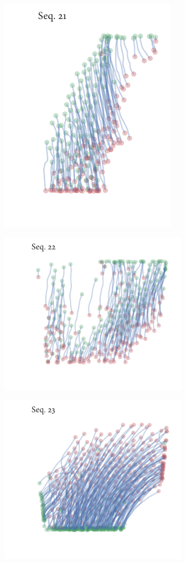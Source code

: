 \begin{figure}[h]
\begin{subfigure}[t]{0.5\textwidth}
		\includegraphics{sequence21.pdf}
	\end{subfigure}%
	\begin{subfigure}[t]{0.5\textwidth}
		\centering
		\includegraphics{sequence22.pdf}
	\end{subfigure}
	\begin{subfigure}[t]{0.5\textwidth}
		\centering
		\includegraphics{sequence23.pdf}

\end{subfigure}
\end{figure}
